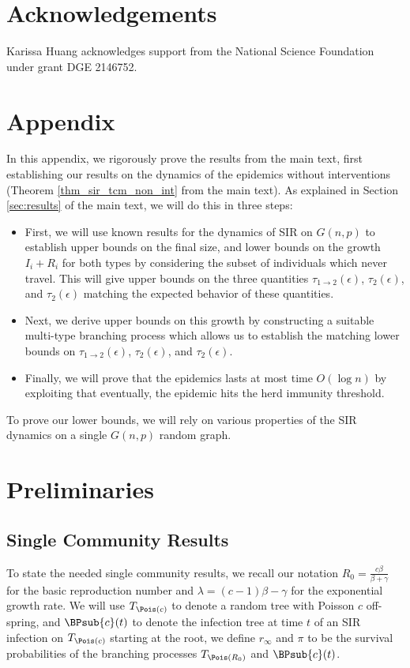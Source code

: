 \documentclass[11pt]{article}
\begin{document}
\section*{Acknowledgements}
Karissa Huang acknowledges support from the National Science Foundation under grant DGE 2146752.




\newpage


\appendix
\section*{Appendix}
In this appendix, we rigorously prove the results from the main text, first establishing our results on the dynamics of the epidemics without interventions (Theorem \ref{thm_sir_tcm_non_int} from the main text). As explained in Section \ref{sec:results} of the main text, we will do this in three steps:
\begin{itemize}
    \item First, we will use known results for the dynamics of SIR on $G(n,p)$ to establish upper bounds on the final size, and
    lower bounds on the growth $I_i+R_i$ for both types by considering the subset of individuals which never travel.  This will give upper bounds on the three quantities $\tau_{1\to 2}(\epsilon)$, $\tau_2(\epsilon)$, and $\tau_2(\epsilon)$ matching the expected behavior of these quantities.
    \item Next, we derive upper bounds on this growth by constructing a suitable multi-type branching process which allows us to establish the matching lower bounds on 
    $\tau_{1\to 2}(\epsilon)$, $\tau_2(\epsilon)$, and $\tau_2(\epsilon)$.
    \item Finally, we will prove that the epidemics lasts at most time $O(\log n)$ by exploiting that eventually, the epidemic hits the herd immunity threshold.
\end{itemize}

To prove our lower bounds, we will rely on various properties of the SIR dynamics on a single $G(n,p)$ random graph.

\section{Preliminaries}

\subsection{Single Community Results}
To state the needed single community results, we recall our notation $R_0=\frac {c\beta}{\beta+\gamma}$ for the basic reproduction number and  $\lambda =(c-1)\beta -\gamma$  for the exponential growth rate.   We will use $T_{\Pois(c)}$ to denote a random tree with Poisson $c$ off-spring, and $\BPsub{c}(t)$ to denote the infection tree at time $t$ of an SIR infection on $T_{\Pois(c)}$ starting at the root,  we define  $r_\infty$ and $\pi$ to be the survival probabilities of the branching processes $T_{\Pois(R_0)}$ and  $\BPsub{c}(t)$.
\end{document}
